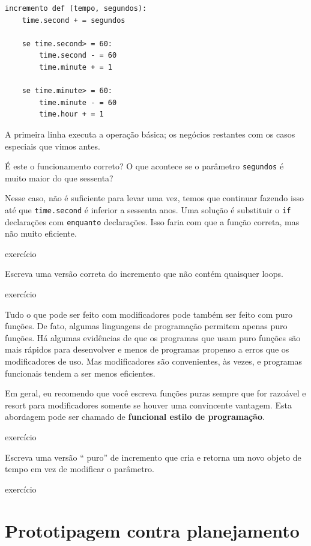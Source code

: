 \documentclass[10pt]{book}
\begin{document}
\begin{v erbatim}
{\begin{verbatim}
incremento def (tempo, segundos):
    time.second + = segundos

    se time.second> = 60:
        time.second - = 60
        time.minute + = 1

    se time.minute> = 60:
        time.minute - = 60
        time.hour + = 1
\end{verbatim}
%
A primeira linha executa a operação básica; os negócios restantes
com os casos especiais que vimos antes.

É este o funcionamento correto? O que acontece se o parâmetro {\tt segundos}
é muito maior do que sessenta?  

Nesse caso, não é suficiente para levar
uma vez, temos que continuar fazendo isso até que {\tt time.second} é inferior a sessenta anos.
Uma solução é substituir o {\tt if} declarações com {\tt enquanto}
declarações. Isso faria com que a função correta, mas não
muito eficiente.

\begin{} exercício

Escreva uma versão correta do incremento {\tt} que
não contém quaisquer loops.

\end{} exercício

Tudo o que pode ser feito com modificadores pode também ser feito com puro
funções. De fato, algumas linguagens de programação permitem apenas puro
funções. Há algumas evidências de que os programas que usam puro
funções são mais rápidos para desenvolver e menos de programas propenso a erros
que os modificadores de uso. Mas modificadores são convenientes, às vezes,
e programas funcionais tendem a ser menos eficientes.

Em geral, eu recomendo que você escreva funções puras sempre que for
razoável e resort para modificadores somente se houver uma convincente
vantagem. Esta abordagem pode ser chamado de {\bf funcional
estilo de programação}.


\begin{} exercício

Escreva uma versão `` puro'' de {incremento \tt} que cria e retorna
um novo objeto de tempo em vez de modificar o parâmetro.

\end{} exercício


\section{Prototipagem contra planejamento}
\label{protótipo}

}
\end{v erbatim}
\end{document}
